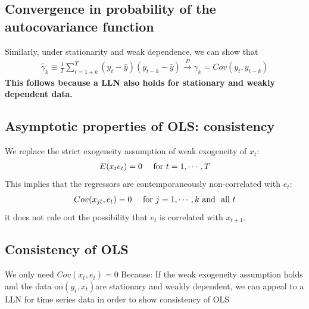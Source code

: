 \documentclass[a4paper,twoside,11pt]{article}
\begin{document}
\subsection{Convergence in probability of the autocovariance function}
Similarly, under stationarity and weak dependence, we can show that
\begin{equation*}
\begin{aligned}
\hat \gamma_k \equiv \frac{1}{T} \sum^T_{t= 1+k} (y_t - \bar y) (y_{t-k} -  \bar y) \overset{P}{\rightarrow} \gamma_k = Cov(y_t, y_{t-k})
\end{aligned}
\end{equation*}
\textcolor{NavyBlue}{\textbf{This follows because a LLN also holds for stationary and weakly dependent data.}}
\subsection{Asymptotic properties of OLS: consistency}
We replace the strict exogeneity assumption of weak exogeneity of $x_t$:
\begin{equation*}
\begin{aligned}
E(x_t e_t)=0 \ \ \ \textmd{\ for} \ t=1,\cdots,T
\end{aligned}
\end{equation*}
This implies that the regressors are contemporaneously non-correlated
with $e_t$:
\begin{equation*}
\begin{aligned}
Cov(x_{jt}, e_t) =0 \ \ \ \ \textmd{for} \ j=1,\cdots, k \ \textmd{and \ all} \ t
\end{aligned}
\end{equation*}
\textcolor{NavyBlue}{it does not rule out the possibility that $e_t$ is correlated with $x_{t+1}$.}
\subsection{Consistency of OLS}
We only need $Cov(x_t, e_t) = 0$ Because: If the weak exogeneity assumption holds and the data on$(y_t,x_t)$are stationary and weakly dependent, we can appeal to a LLN for time series data in order to show consistency of OLS
\end{document}
